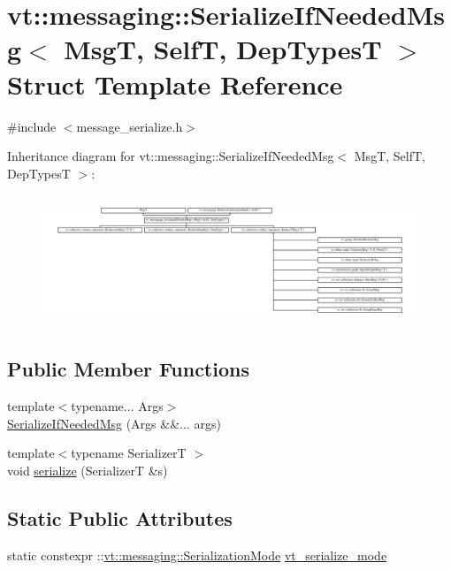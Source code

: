 \hypertarget{structvt_1_1messaging_1_1_serialize_if_needed_msg}{}\section{vt\+:\+:messaging\+:\+:Serialize\+If\+Needed\+Msg$<$ MsgT, SelfT, Dep\+TypesT $>$ Struct Template Reference}
\label{structvt_1_1messaging_1_1_serialize_if_needed_msg}


{\ttfamily \#include $<$message\+\_\+serialize.\+h$>$}

Inheritance diagram for vt\+:\+:messaging\+:\+:Serialize\+If\+Needed\+Msg$<$ MsgT, SelfT, Dep\+TypesT $>$\+:\begin{figure}[H]
\begin{center}
\leavevmode
\includegraphics[height=3.938619cm]{structvt_1_1messaging_1_1_serialize_if_needed_msg}
\end{center}
\end{figure}
\subsection*{Public Member Functions}
\begin{DoxyCompactItemize}
\item 
{\footnotesize template$<$typename... Args$>$ }\\\hyperlink{structvt_1_1messaging_1_1_serialize_if_needed_msg_aeca13b16b58fca6e1987d5d19d57b3b8}{Serialize\+If\+Needed\+Msg} (Args \&\&... args)
\item 
{\footnotesize template$<$typename SerializerT $>$ }\\void \hyperlink{structvt_1_1messaging_1_1_serialize_if_needed_msg_acaf8965385e80bbbaabc8d335fe90eed}{serialize} (SerializerT \&s)
\end{DoxyCompactItemize}
\subsection*{Static Public Attributes}
\begin{DoxyCompactItemize}
\item 
static constexpr \+::\hyperlink{namespacevt_1_1messaging_a436c5b9fc7f591e5978a136999cb9ef8}{vt\+::messaging\+::\+Serialization\+Mode} \hyperlink{structvt_1_1messaging_1_1_serialize_if_needed_msg_aae6c39c834f1aa059dadd77324ca750b}{vt\+\_\+serialize\+\_\+mode}
\end{DoxyCompactItemize}



